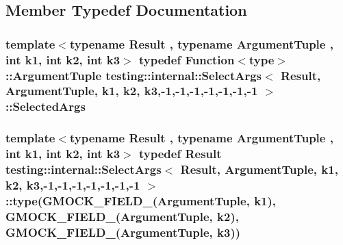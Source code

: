 \subsection{Member Typedef Documentation}
\subsubsection[{\texorpdfstring{Selected\+Args}{SelectedArgs}}]{\setlength{\rightskip}{0pt plus 5cm}template$<$typename Result , typename Argument\+Tuple , int k1, int k2, int k3$>$ typedef {\bf Function}$<${\bf type}$>$\+::Argument\+Tuple {\bf testing\+::internal\+::\+Select\+Args}$<$ Result, Argument\+Tuple, k1, k2, k3,-\/1,-\/1,-\/1,-\/1,-\/1,-\/1,-\/1 $>$\+::{\bf Selected\+Args}}\hypertarget{classtesting_1_1internal_1_1_select_args_3_01_result_00_01_argument_tuple_00_01k1_00_01k2_00_01k662b7b95311371409ab0c0d22a638b79_a3c328563b5d89854bf85a03004fd2f88}{}\label{classtesting_1_1internal_1_1_select_args_3_01_result_00_01_argument_tuple_00_01k1_00_01k2_00_01k662b7b95311371409ab0c0d22a638b79_a3c328563b5d89854bf85a03004fd2f88}
\subsubsection[{\texorpdfstring{type}{type}}]{\setlength{\rightskip}{0pt plus 5cm}template$<$typename Result , typename Argument\+Tuple , int k1, int k2, int k3$>$ typedef Result {\bf testing\+::internal\+::\+Select\+Args}$<$ Result, Argument\+Tuple, k1, k2, k3,-\/1,-\/1,-\/1,-\/1,-\/1,-\/1,-\/1 $>$\+::type({\bf G\+M\+O\+C\+K\+\_\+\+F\+I\+E\+L\+D\+\_\+}(Argument\+Tuple, k1), {\bf G\+M\+O\+C\+K\+\_\+\+F\+I\+E\+L\+D\+\_\+}(Argument\+Tuple, k2), {\bf G\+M\+O\+C\+K\+\_\+\+F\+I\+E\+L\+D\+\_\+}(Argument\+Tuple, k3))}\hypertarget{classtesting_1_1internal_1_1_select_args_3_01_result_00_01_argument_tuple_00_01k1_00_01k2_00_01k662b7b95311371409ab0c0d22a638b79_a119de974a2cbe11218028beb465aa012}{}\label{classtesting_1_1internal_1_1_select_args_3_01_result_00_01_argument_tuple_00_01k1_00_01k2_00_01k662b7b95311371409ab0c0d22a638b79_a119de974a2cbe11218028beb465aa012}


